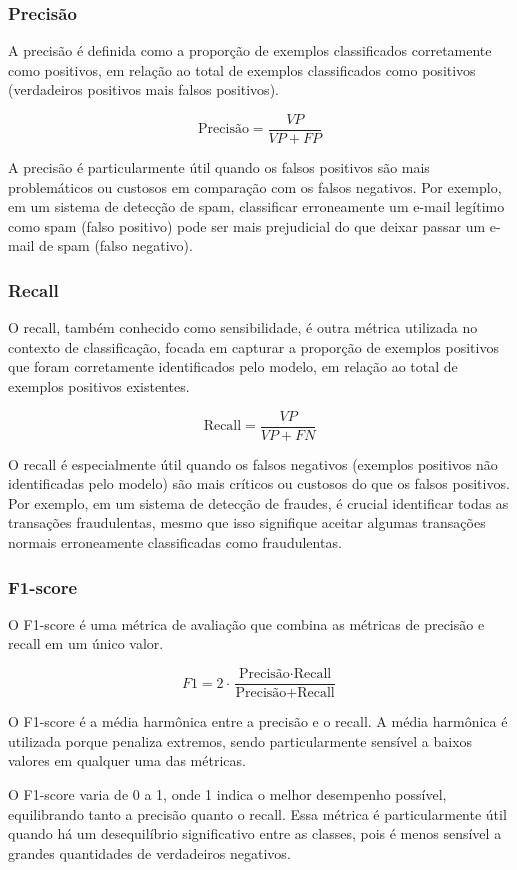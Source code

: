 \subsubsection{Precisão}

A precisão é definida como a proporção de exemplos classificados corretamente como positivos, em 
relação ao total de exemplos classificados como positivos (verdadeiros positivos mais falsos positivos).

\begin{equation}
  \text{Precisão} = \frac{VP}{VP + FP}
\end{equation}

A precisão é particularmente útil quando os falsos positivos são mais problemáticos ou custosos
em comparação com os falsos negativos. Por exemplo, em um sistema de detecção de spam, classificar 
erroneamente um e-mail legítimo como spam (falso positivo) pode ser mais prejudicial do que deixar
passar um e-mail de spam (falso negativo).

\subsubsection{Recall}

O recall, também conhecido como sensibilidade, é outra métrica utilizada no contexto de classificação, 
focada em capturar a proporção de exemplos positivos que foram corretamente identificados pelo modelo,
em relação ao total de exemplos positivos existentes.

\begin{equation}
  \text{Recall} = \frac{VP}{VP + FN}
\end{equation}

O recall é especialmente útil quando os falsos negativos (exemplos positivos não identificadas pelo modelo) 
são mais críticos ou custosos do que os falsos positivos. Por exemplo, em um sistema de detecção de fraudes,
é crucial identificar todas as transações fraudulentas, mesmo que isso signifique aceitar algumas transações 
normais erroneamente classificadas como fraudulentas.


\subsubsection{F1-score}

O F1-score é uma métrica de avaliação que combina as métricas de precisão e recall em um único valor. 

\begin{equation}
  F1 = 2 \cdot \frac{\text{Precisão} \cdot \text{Recall}}{\text{Precisão} + \text{Recall}}
\end{equation}

O F1-score é a média harmônica entre a precisão e o recall. A média harmônica é utilizada porque penaliza extremos, 
sendo particularmente sensível a baixos valores em qualquer uma das métricas.

O F1-score varia de 0 a 1, onde 1 indica o melhor desempenho possível, equilibrando tanto a precisão quanto o recall.
Essa métrica é particularmente útil quando há um desequilíbrio significativo entre as classes, 
pois é menos sensível a grandes quantidades de verdadeiros negativos.